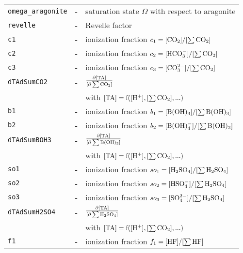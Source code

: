 \documentclass[article,nojss]{jss}
\begin{document}
\begin{footnotesize}
\begin{longtable}{l|l|p{7cm}}
\texttt{omega\_aragonite} & -                          & saturation state $\Omega$ with respect to aragonite\\
\texttt{revelle}     & -                               & Revelle factor\\    
\texttt{c1}          & -                               & ionization fraction $c_1 = [\rm CO_2]/[\rm \sum CO_2]$\\
\texttt{c2}          & -                               & ionization fraction $c_2 = [\rm HCO_3^-]/[\rm \sum CO_2]$\\
\texttt{c3}          & -                               & ionization fraction $c_3 = [\rm CO_3^{2-}]/[\rm \sum CO_2]$\\
\texttt{dTAdSumCO2}  & -                               & $\rm \frac{\partial [TA]}{[\partial \sum CO_2]}$\\
            &                                 & with $\rm[TA] = f([H^+], [\sum CO_2], ...)$\\
\texttt{b1}          & -                               & ionization fraction $b_1 = [\rm B(OH)_3]/[\rm \sum B(OH)_3]$\\               
\texttt{b2}          & -                               & ionization fraction $b_2 = [\rm B(OH)_4^-]/[\rm \sum B(OH)_3]$\\               
\texttt{dTAdSumBOH3} & -                               & $\rm \frac{\partial [TA]}{[\partial \sum B(OH)_3]}$\\
            &                                 & with $\rm [TA] = f([H^+], [\sum CO_2], ...)$\\
\texttt{so1}         & -                               & ionization fraction $so_1 = [\rm H_2SO_4]/[\rm \sum H_2SO_4]$\\               
\texttt{so2}         & -                               & ionization fraction $so_2 = [\rm HSO_4^-]/[\rm \sum H_2SO_4]$\\               
\texttt{so3}         & -                               & ionization fraction $so_3 = [\rm SO_4^{2-}]/[\rm \sum H_2SO_4]$\\               
\texttt{dTAdSumH2SO4}& -                               & $\rm \frac{\partial [TA]}{[\partial \sum H_2SO_4]}$\\
            &                                 & with $\rm [TA] = f([H^+], [\sum CO_2], ...)$\\   
\texttt{f1}          & -                               & ionization fraction $f_1 = [\rm HF]/[\rm \sum HF]$\\               

\end{longtable}
\end{footnotesize}
\end{document}
